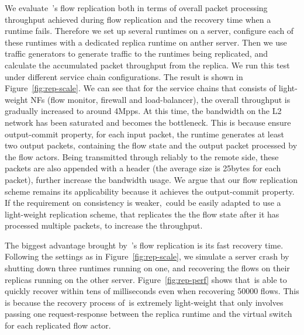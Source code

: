 We evaluate~\nfactor's flow replication both in terms of overall packet processing throughput achieved during flow replication and the recovery time when a runtime fails.  Therefore we set up several runtimes on a server, configure each of these runtimes with a dedicated replica runtime on anther server. Then we use traffic generators to generate traffic to the runtimes being replicated, and calculate the accumulated packet throughput from the replica. We run this test under different service chain configurations. The result is shown in Figure~\ref{fig:rep-scale}. We can see that for the service chains that consists of light-weight NFs (flow monitor, firewall and load-balancer), the overall throughput is gradually increased to around 4Mpps. At this time, the bandwidth on the L2 network has been saturated and becomes the bottleneck. This is because ensure output-commit property, for each input packet, the runtime generates at least two output packets, containing the flow state and the output packet processed by the flow actors. Being transmitted through reliably to the remote side, these packets are also appended with a header (the average size is 25bytes for each packet), further increase the bandwidth usage. We argue that our flow replication scheme remains its applicability because it achieves the output-commit property. If the requirement on consistency is weaker,~\nfactor could be easily adapted to use a light-weight replication scheme, that replicates the the flow state after it has processed multiple packets, to increase the throughput.

The biggest advantage brought by~\nfactor's flow replication is its fast recovery time. Following the settings as in Figure~\ref{fig:rep-scale}, we simulate a server crash by shutting down three runtimes running on one, and recovering the flows on their replicas running on the other server. Figure~\ref{fig:rep-perf} shows that~\nfactor is able to quickly recover within tens of milliseconds even when recovering 50000 flows. This is because the recovery process of~\nfactor is extremely light-weight that only involves passing one request-response between the replica runtime and the virtual switch for each replicated flow actor.



